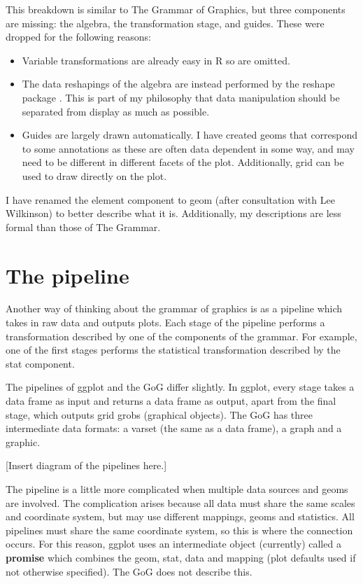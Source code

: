 This breakdown is similar to The Grammar of Graphics, but three components are missing: the algebra, the transformation stage, and guides.  These were dropped for the following reasons:

\begin{itemize}
	\item Variable transformations are already easy in R so are omitted.
	
	\item The data reshapings of the algebra are instead performed by the reshape package \citep{reshape}.  This is part of my philosophy that data manipulation should be separated from display as much as possible.
	
	\item Guides are largely drawn automatically.  I have created geoms that correspond to some annotations as these are often data dependent in some way, and may need to be different in different facets of the plot.  Additionally, grid can be used to draw directly on the plot.
\end{itemize}

I have renamed the element component to geom (after consultation with Lee Wilkinson) to better describe what it is.  Additionally, my descriptions are less formal than those of The Grammar.  

\section{The pipeline}\label{sec:the_pipeline}

Another way of thinking about the grammar of graphics is as a pipeline which takes in raw data and outputs plots.  Each stage of the pipeline performs a transformation described by one of the components of the grammar.  For example, one of the first stages performs the statistical transformation described by the stat component.  

The pipelines of ggplot and the GoG differ slightly.  In ggplot, every stage takes a data frame as input and returns a data frame as output, apart from the final stage, which outputs grid grobs (graphical objects).  The GoG has three intermediate data formats: a varset (the same as a data frame), a graph and a graphic.

[Insert diagram of the pipelines here.]

The pipeline is a little more complicated when multiple data sources and geoms are involved.  The complication arises because all data must share the same scales and coordinate system, but may use different mappings, geoms and statistics.  All pipelines must share the same coordinate system, so this is where the connection occurs.  For this reason, ggplot uses an intermediate object (currently) called a {\bf promise} which combines the geom, stat, data and mapping (plot defaults used if not otherwise specified).  The GoG does not describe this.

